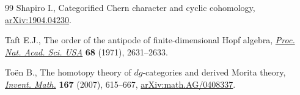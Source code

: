 \begin{thebibliography}{99}
Shapiro I., Categorified {C}hern character and cyclic cohomology,
 \href{https://arxiv.org/abs/1904.04230}{arXiv:1904.04230}.

Taft E.J., The order of the antipode of finite-dimensional {H}opf algebra,
 \href{https://doi.org/10.1073/pnas.68.11.2631}{\textit{Proc. Nat. Acad. Sci. USA}} \textbf{68} (1971), 2631--2633.

To\"en B., The homotopy theory of {$dg$}-categories and derived {M}orita
 theory, \href{https://doi.org/10.1007/s00222-006-0025-y}{\textit{Invent. Math.}} \textbf{167} (2007), 615--667,
 \href{https://arxiv.org/abs/math.AG/0408337}{arXiv:math.AG/0408337}.

\end{thebibliography}
